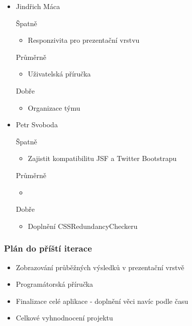 \documentclass{beamer}
\begin{document}
\begin{frame}[allowframebreaks]
\begin{itemize}
    \item Jindřich Máca
      \begin{block}{Špatně} %
       \begin{itemize}
        \item Responzivita pro prezentační vrstvu
       \end{itemize}
     \end{block}
     \begin{block}{Průměrně} %
        \begin{itemize}
        \item Uživatelská příručka
       \end{itemize}
     \end{block}
     \begin{block}{Dobře} %
       \begin{itemize}
        \item Organizace týmu
       \end{itemize}
     \end{block}
   
    \item Petr Svoboda
      \begin{block}{Špatně} %
       \begin{itemize}
        \item Zajistit kompatibilitu JSF a Twitter Bootstrapu
       \end{itemize}
     \end{block}
     \begin{block}{Průměrně} %
        \begin{itemize}
				\item
       \end{itemize}
     \end{block}
     \begin{block}{Dobře} %
       \begin{itemize}
        \item Doplnění CSSRedundancyCheckeru
       \end{itemize}
     \end{block}
   \end{itemize}
\end{frame}

\begin{frame}[allowframebreaks]\frametitle{Plán do příští iterace}
  \begin{itemize}
    \item Zobrazování průběžných výsledků v prezentační vrstvě
		\item Programátorská příručka
		\item Finalizace celé aplikace - doplnění věci navíc podle času
		\item Celkové vyhnodnocení projektu
  \end{itemize}
\end{frame}
\end{document}
